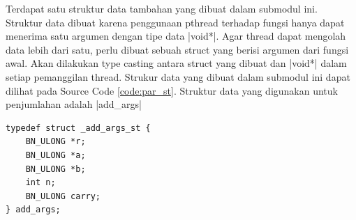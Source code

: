       Terdapat satu struktur data tambahan yang dibuat dalam submodul ini. Struktur data dibuat karena penggunaan pthread terhadap fungsi hanya dapat menerima satu argumen dengan tipe data |void*|. Agar thread dapat mengolah data lebih dari satu, perlu dibuat sebuah struct yang berisi argumen dari fungsi awal. Akan dilakukan type casting antara struct yang dibuat dan |void*| dalam setiap pemanggilan thread. Strukur data yang dibuat dalam submodul ini dapat dilihat pada Source Code \ref{code:par_st}. Struktur data yang digunakan untuk penjumlahan adalah |add_args|

      \begin{lstlisting}[caption={Struktur Data bignum}, label={code:par_st}]
typedef struct _add_args_st {
    BN_ULONG *r;
    BN_ULONG *a;
    BN_ULONG *b;
    int n;
    BN_ULONG carry;
} add_args;
      \end{lstlisting}

